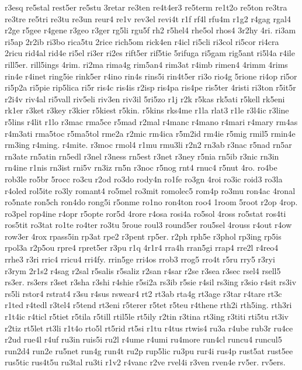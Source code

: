 {r3esq
re5stal
rest5er
re5stu
3retar
re3ten
re4t4er3
re5term
re1t2o
re5ton
re3tra
re3tre
re5tri
re3tu
re3un
reur4
re1v
rev3el
revi4t
r1f
rf4l
rfu4m
r1g2
r4gag
rgal4
r2ge
r5gee
r4gene
r3geo
r3ger
rg5li
rgu5f
rh2
r5hel4
rhe5ol
rhos4
3r2hy
4ri.
ri3am
ri5ap
2r2ib
ri3bo
rica5tu
2rice
rich5om
rick4en
r4icl
ri5cli
ri3col
ri5cor
ri4cra
2ricu
rid4al
rid4e
ri5el
ri3er
ri2es
rift5er
rif5tie
5rifuga
ri5gam
rig5ant
ri5l4a
r4ile
rill5er.
rill5ings
4rim.
ri2ma
rima4g
rim5an4
rim3at
r4imb
rimen4
4rimm
4rims
rin4e
r4inet
ring5ie
rink5er
r4ino
rin4s
rins5i
rin4t5er
ri3o
rio4g
5rione
ri4op
ri5or
ri5p2a
ri5pie
rip5lica
ri5r
ris4c
ris4is
r2isp
ris4pa
ris4pe
ris5ter
4risti
ri3ton
r5it5r
r2i4v
riv4al
ri5vall
riv5eli
riv3en
riv3il
5ri5zo
r1j
r2k
r5kas
rk5ati
r5kell
rk5eni
rk1er
r3ket
r3key
r3kier
r5kiest
r5kin.
r5kins
rks4me
r1la
rlat3
r1le
r3l4ic
r3line
r5lins
r4lit
r1lo
r3mac
rma5ce
r5mad
r2mal
r4manc
r4mano
r4mari
r4mary
rm4as
r4m3ati
rma5toc
r5ma5tol
rme2a
r2mic
rm4ica
r5m2id
rm4ie
r5mig
rmil5
rmin4e
rm3ing
r4ming.
r4mite.
r3moc
rmol4
r1mu
rmu3li
r2n2
rn3ab
r3nac
r5nad
rn5ar
rn3ate
rn5atin
rn5edl
r3nel
r3ness
rn5est
r3net
r3ney
r5nia
rn5ib
r3nic
rn3in
rn4ine
r1nis
rn3ist
rni5v
rn3iz
rn5n
r3noc
r5nog
rnt4
rnuc4
r5nut
4ro.
ro4be
rob3le
ro5br
5rocc
ro3cu
r2od
ro3do
rody4n
ro1fe
ro3gn
4roi
ro3ic
roid3
ro3la
r4oled
rol5ite
ro3ly
romant4
ro5mel
ro3mit
romolec5
rom4p
ro3mu
ron4ac
4ronal
ro5nate
ron5ch
ron4do
rong5i
r5onme
ro1no
ron4ton
roo4
1room
5root
r2op
4rop.
ro3pel
rop4ine
r4opr
r5opte
ror5d
4rore
r4osa
rosi4a
ro5sol
4ross
ro5stat
ros4ti
ros5tit
ro3tat
ro1te
ro4ter
ro3tu
5roue
roul3
round5er
rou5sel
4rouss
r4out
r4ow
row3er
4rox
rpass5in
rp3at
rpe2
r3pent
rp5er.
r2ph
rph5e
r3phol
rp3ing
rp5is
rpol3a
r2p5ou
rpre4
rpret5er
r3pu
r1q
4r1r4
rra4h
rran5gi
rrap4
rre2l
r4reo4
rrhe3
r3ri
rric4
rricu4
rri4fy.
rrin5ge
rri4os
rrob3
rrog5
rro4t
r5ru
rry5
r3ryi
r3rym
2r1s2
r4sag
r2sal
r5salis
r5saliz
r2san
r4sar
r2se
r3sea
r3sec
rsel4
rsell5
rs3er.
rs3ers
r3set
r3sha
r3shi
r4shie
r5si2a
rs3ib
r5sie
r4sil
rs3ing
r3sio
r4sit
rs3iv
rs5li
rstor4
rstrat4
r3su
r4sus
rswear4
rt2
rt3ab
rta4g
rt3age
r3tar
r4tare
rt3c
r1ted
r4tedl
r3tel4
r5tend
rt3eni
r5terer
r5tet
r5teu
r4thene
rth2i
rth5ing.
rth3ri
r1t4ic
r4ticl
r5tiet
r5tila
r5till
rtil5le
rt5ily
r2tin
r3tina
rt3ing
r3titi
rti5tu
rt3iv
r2tiz
rt5let
rt3li
r1t4o
rto5l
rt5rid
rt5si
r1tu
r4tus
rtwis4
ru3a
r4ube
rub3r
ru4ce
r2ud
rue4l
r4uf
ru3in
ruis5i
ru2l
r4ume
r4umi
ru4more
run4cl
runcu4
runcul5
run2d4
run2e
ru5net
run4g
run4t
ru2p
rup5lic
ru3pu
rur4i
rus4p
rust5at
rust5ee
rus5tic
rus4t5u
ru3tal
ru3ti
r1v2
r4vanc
r2ve
rvel4i
r3ven
rven4e
rv5er.
rv5ers.
}
